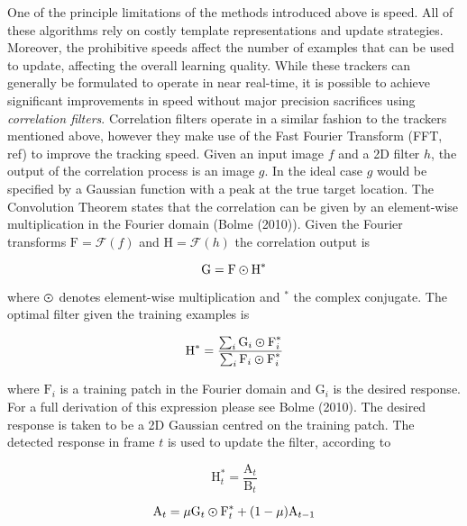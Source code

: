 One of the principle limitations of the methods introduced above is speed. All of these algorithms rely on costly template representations and update strategies. Moreover, the prohibitive speeds affect the number of examples that can be used to update, affecting the overall learning quality. While these trackers can generally be formulated to operate in near real-time, it is possible to achieve significant improvements in speed without major precision sacrifices using \textit{correlation filters}. Correlation filters operate in a similar fashion to the trackers mentioned above, however they make use of the Fast Fourier Transform (FFT, ref) to improve the tracking speed. Given an input image $f$ and a 2D filter $h$, the output of the correlation process is an image $g$. In the ideal case $g$ would be specified by a Gaussian function with a peak at the true target location. The Convolution Theorem states that the correlation can be given by an element-wise multiplication in the Fourier domain (Bolme (2010)). Given the Fourier transforms $\text{F} = \mathcal{F}(f)$ and $\text{H} = \mathcal{F}(h)$ the correlation output is 

\begin{equation}
\text{G} = \text{F} \varodot \text{H}^*
\end{equation}

\noindent where $\varodot$ denotes element-wise multiplication and $^*$ the complex conjugate. The optimal filter given the training examples is 

\begin{equation}
\text{H}^* = \frac{\sum_i \text{G}_i \varodot \text{F}_i^*}{\sum_i \text{F}_i \varodot \text{F}_i^*}
\end{equation}

\noindent where $\text{F}_i$ is a training patch in the Fourier domain and $\text{G}_i$ is the desired response. For a full derivation of this expression please see Bolme (2010). The desired response is taken to be a 2D Gaussian centred on the training patch. The detected response in frame $t$ is used to update the filter, according to

\begin{equation}
\text{H}_t^* = \frac{\text{A}_t}{\text{B}_t}
\end{equation}

\begin{equation}
\text{A}_t = \mu \text{G}_t \varodot \text{F}_t^* + (1 - \mu)\text{A}_{t-1}
\end{equation}

